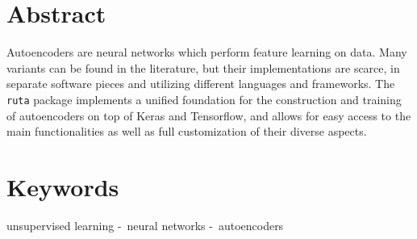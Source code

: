 \setchapterpreamble[u]{\margintoc}
\label{ch:paper2}

  \section*{Abstract}

Autoencoders are neural networks which perform feature learning on data. Many variants can be found in the literature, but their implementations are scarce, in separate software pieces and utilizing different languages and frameworks. The \texttt{ruta} package implements a unified foundation for the construction and training of autoencoders on top of Keras and Tensorflow, and allows for easy access to the main functionalities as well as full customization of their diverse aspects.


  \providecommand{\sep}{-~}
  \section*{Keywords}
unsupervised learning \sep neural networks \sep autoencoders






